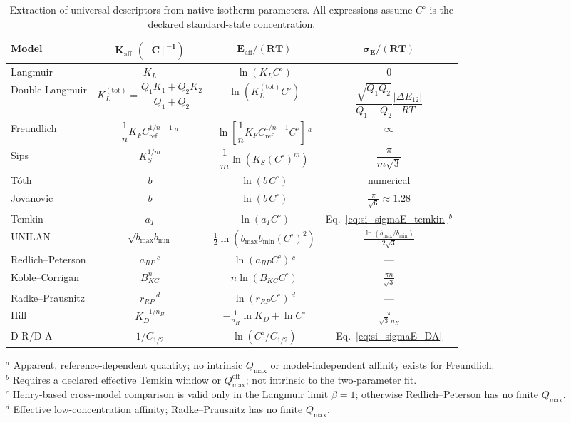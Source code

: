 \documentclass[journal=aamick,manuscript=article]{achemso}
\begin{document}
\begin{table}[H]
	\centering
	\small
	\caption{Extraction of universal descriptors from native isotherm
		parameters.  All expressions assume $C^\circ$ is the declared
		standard-state concentration.}
	\label{tab:si_extraction}
	\renewcommand{\arraystretch}{1.5}
	\begin{tabular}{@{} l c c c @{}}
		\toprule
		\textbf{Model}
		& $\boldsymbol{K_{\mathrm{aff}}}$ $\boldsymbol{([C]^{-1})}$
		& $\boldsymbol{E_{\mathrm{aff}}/(RT)}$
		& $\boldsymbol{\sigma_E/(RT)}$ \\
		\midrule
		Langmuir
		& $K_L$
		& $\ln(K_L C^\circ)$
		& $0$ \\
		Double Langmuir
		& $K_L^{\mathrm{(tot)}} = \dfrac{Q_1K_1 + Q_2K_2}{Q_1+Q_2}$
		& $\ln(K_L^{\mathrm{(tot)}} C^\circ)$
		& $\dfrac{\sqrt{Q_1Q_2}}{Q_1+Q_2}\dfrac{|\Delta E_{12}|}{RT}$ \\
		Freundlich
		& $\dfrac{1}{n}K_F C_{\mathrm{ref}}^{1/n-1}$\,$^{a}$
		& $\ln\!\left[\dfrac{1}{n}K_F C_{\mathrm{ref}}^{1/n-1} C^\circ\right]$\,$^{a}$
		& $\infty$ \\
		Sips
		& $K_S^{1/m}$
		& $\dfrac{1}{m}\ln(K_S (C^\circ)^m)$
		& $\dfrac{\pi}{m\sqrt{3}}$ \\
		T\'{o}th
		& $b$
		& $\ln(b\,C^\circ)$
		& numerical \\
		Jovanovic
		& $b$
		& $\ln(b\,C^\circ)$
		& $\frac{\pi}{\sqrt{6}} \approx 1.28$ \\
		Temkin
		& $a_T$
		& $\ln(a_T C^\circ)$
		& Eq.~\ref{eq:si_sigmaE_temkin}\,$^{b}$ \\
		UNILAN
		& $\sqrt{b_{\max}b_{\min}}$
		& $\frac{1}{2}\ln(b_{\max}b_{\min}(C^\circ)^2)$
		& $\frac{\ln(b_{\max}/b_{\min})}{2\sqrt{3}}$ \\
		Redlich--Peterson
		& $a_{RP}$\,$^{c}$
		& $\ln(a_{RP} C^\circ)$\,$^{c}$
		& --- \\
		Koble--Corrigan
		& $B_{KC}^{n}$
		& $n\ln(B_{KC} C^\circ)$
		& $\frac{\pi n}{\sqrt{3}}$ \\
		Radke--Prausnitz
		& $r_{RP}$\,$^{d}$
		& $\ln(r_{RP} C^\circ)$\,$^{d}$
		& --- \\
		Hill
		& $K_D^{-1/n_H}$
		& $-\frac{1}{n_H}\ln K_D + \ln C^\circ$
		& $\frac{\pi}{\sqrt{3}\,n_H}$ \\
		D-R/D-A
		& $1/C_{1/2}$
		& $\ln(C^\circ/C_{1/2})$
		& Eq.~\ref{eq:si_sigmaE_DA} \\
		\bottomrule
	\end{tabular}

	\smallskip

	\noindent $^{a}$ Apparent, reference-dependent quantity; no intrinsic
	$Q_{\max}$ or model-independent affinity exists for Freundlich.\\
	\noindent $^{b}$ Requires a declared effective Temkin window or
	$Q_{\max}^{\mathrm{eff}}$; not intrinsic to the two-parameter fit.\\
	\noindent $^{c}$ Henry-based cross-model comparison is valid only in the
	Langmuir limit $\beta = 1$; otherwise Redlich--Peterson has no finite
	$Q_{\max}$.\\
	\noindent $^{d}$ Effective low-concentration affinity; Radke--Prausnitz has
	no finite $Q_{\max}$.
\end{table}
\end{document}
